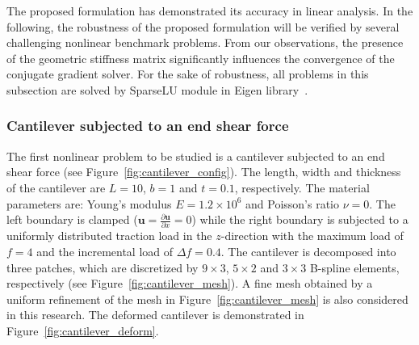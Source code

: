 The proposed formulation has demonstrated its accuracy in linear analysis. In the following, the robustness of the proposed formulation will be verified by several challenging nonlinear benchmark problems. From our observations, the presence of the geometric stiffness matrix significantly influences the convergence of the conjugate gradient solver. For the sake of robustness, all problems in this subsection are solved by SparseLU module in Eigen library~\cite{eigenweb}.

\subsubsection{Cantilever subjected to an end shear force}

The first nonlinear problem to be studied is a cantilever subjected to an end shear force (see Figure~\ref{fig:cantilever_config}). The length, width and thickness of the cantilever are $L = 10$, $b = 1$ and $t = 0.1$, respectively. The material parameters are: Young's modulus $E = 1.2\times 10^6$ and Poisson's ratio $\nu = 0$. The left boundary is clamped ($\mathbf{u}=\frac{\partial \mathbf{u}}{\partial x}=0$) while the right boundary is subjected to a uniformly distributed traction load in the $z$-direction with the maximum load of $f=4$ and the incremental load of $\Delta f = 0.4$. The cantilever is decomposed into three patches, which are discretized by $9\times 3$, $5\times 2$ and $3\times 3$ B-spline elements, respectively (see Figure~\ref{fig:cantilever_mesh}). A fine mesh obtained by a uniform refinement of the mesh in Figure~\ref{fig:cantilever_mesh} is also considered in this research. The deformed cantilever is demonstrated in Figure~\ref{fig:cantilever_deform}.
